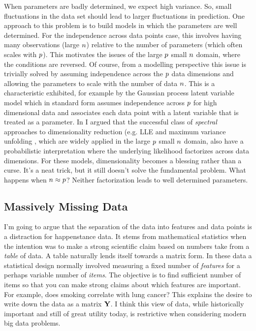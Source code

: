 \documentclass[a4paperpaper,]{article}
\begin{document}
When parameters are badly determined, we expect high variance. So, small
fluctuations in the data set should lead to larger fluctuations in
prediction. One approach to this problem is to build models in which the
parameters are well determined. For the independence across data points
case, this involves having many observations (large \(n\))
relative to the number of parameters (which often scales with
\(p\)). This motivates the issues of the large \(p\) small
\(n\) domain, where the conditions are reversed. Of course, from
a modelling perspective this issue is trivially solved by assuming
independence across the \(p\) data dimensions and allowing the
parameters to scale with the number of data \(n\). This is a
characteristic exhibited, for example by the Gaussian process latent
variable model \citep{Lawrence:pnpca05} which in standard form assumes
independence across \(p\) for high dimensional data and
associates each data point with a latent variable that is treated as a
parameter. In \citep{Lawrence:unifying12} I argued that the successful
class of \emph{spectral} approaches to dimensionality reduction (e.g.
LLE \citet{Roweis:lle00} and maximum variance unfolding
\citet{Weinberger:learning04}, which are widely applied in the large
\(p\) small \(n\) domain, also have a probabilistic
interpretation where the underlying likelihood factorizes across data
dimensions. For these models, dimensionality becomes a blessing rather
than a curse. It's a neat trick, but it still doesn't solve the
fundamental problem. What happens when \(n \approx p\)?
Neither factorization leads to well determined parameters.

\hypertarget{massively-missing-data}{%
\subsection{Massively Missing Data}\label{massively-missing-data}}

I'm going to argue that the separation of the data into features and
data points is a distraction for happenstance data. It stems from
mathematical statistics when the intention was to make a strong
scientific claim based on numbers take from a \emph{table} of data. A
table naturally lends itself towards a matrix form. In these data a
statistical design normally involved measuring a fixed number of
\emph{features} for a perhaps variable number of \emph{items}. The
objective is to find sufficient number of items so that you can make
strong claims about which features are important. For example, does
smoking correlate with lung cancer? This explains the desire to write
down the data as a matrix \(\mathbf{Y}\). I think this view of data,
while historically important and still of great utility today, is
restrictive when considering modern big data problems.
\end{document}
